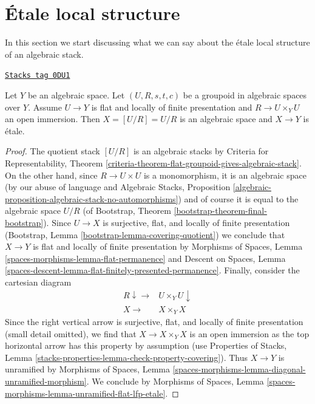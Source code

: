 \section{\'Etale local structure}
\label{stacks-morphisms-section-etale-local}
In this section we start discussing what we can say
about the \'etale local structure of an algebraic stack.

\begin{lemma}
\label{stacks-morphisms-lemma-quotient-etale}
\href{https://stacks.math.columbia.edu/tag/0DU1}{\texttt{Stacks tag 0DU1}}

Let $Y$ be an algebraic space.
Let $(U, R, s, t, c)$ be a groupoid in algebraic spaces over $Y$.
Assume $U \to Y$ is flat and locally of finite presentation
and $R \to U \times_Y U$ an open immersion.
Then $X = [U/R] = U/R$ is an algebraic space and $X \to Y$
is \'etale.
\end{lemma}

\begin{proof}
The quotient stack $[U/R]$ is an algebraic stacks by
Criteria for Representability, Theorem
\ref{criteria-theorem-flat-groupoid-gives-algebraic-stack}.
On the other hand, since $R \to U \times U$ is a monomorphism,
it is an algebraic space (by our abuse of language and
Algebraic Stacks, Proposition
\ref{algebraic-proposition-algebraic-stack-no-automorphisms})
and of course it is equal to the algebraic space $U/R$
(of Bootstrap, Theorem \ref{bootstrap-theorem-final-bootstrap}).
Since $U \to X$ is surjective, flat, and locally of finite presentation
(Bootstrap, Lemma \ref{bootstrap-lemma-covering-quotient})
we conclude that $X \to Y$ is flat and locally of finite presentation by
Morphisms of Spaces, Lemma \ref{spaces-morphisms-lemma-flat-permanence}
and
Descent on Spaces, Lemma
\ref{spaces-descent-lemma-flat-finitely-presented-permanence}.
Finally, consider the cartesian diagram
$$
\begin{array}{cc}R \downarrow\longrightarrow & U \times_Y U \downarrow \\ X \longrightarrow & X \times_Y X\end{array}
$$
Since the right vertical arrow is surjective, flat, and
locally of finite presentation (small detail omitted), we
find that $X \to X \times_Y X$ is an open immersion as the top horizontal arrow
has this property by assumption (use
Properties of Stacks, Lemma
\ref{stacks-properties-lemma-check-property-covering}).
Thus $X \to Y$ is unramified by
Morphisms of Spaces, Lemma
\ref{spaces-morphisms-lemma-diagonal-unramified-morphism}.
We conclude by
Morphisms of Spaces, Lemma
\ref{spaces-morphisms-lemma-unramified-flat-lfp-etale}.
\end{proof}


